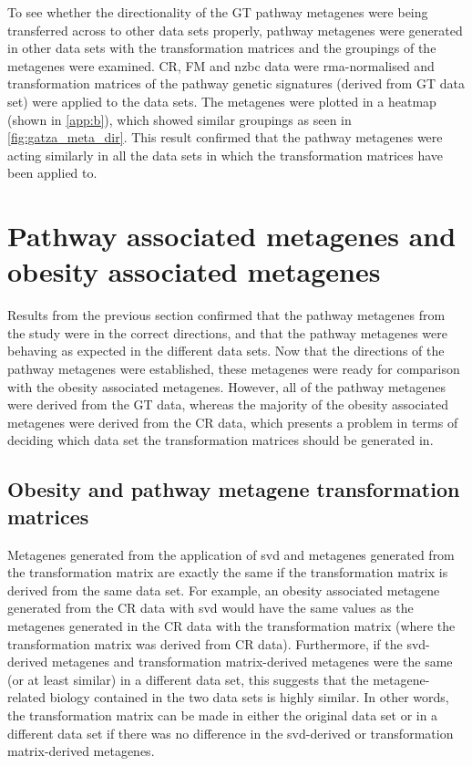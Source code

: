 To see whether the directionality of the GT pathway metagenes were being transferred across to other data sets properly, pathway metagenes were generated in other data sets with the transformation matrices and the groupings of the metagenes were examined.
CR, FM and \gls{nzbc} data were \gls{rma}-normalised and transformation matrices of the pathway genetic signatures (derived from GT data set) were applied to the data sets.
The metagenes were plotted in a heatmap (shown in \cref{app:b}), which showed similar groupings  as seen in \cref{fig:gatza_meta_dir}.
This result confirmed that the pathway metagenes were acting similarly in all the data sets in which the transformation matrices have been applied to.

\section{Pathway associated metagenes and obesity associated metagenes}
\label{sec:pathway_associated_metagenes_and_obesity_associated_metagenes}

Results from the previous section confirmed that the pathway metagenes from the \citet{Gatza2010a} study were in the correct directions, and that the pathway metagenes were behaving as expected in the different data sets.
Now that the directions of the pathway metagenes were established, these metagenes were ready for comparison with the obesity associated metagenes.
However, all of the pathway metagenes were derived from the GT data, whereas the majority of the obesity associated metagenes were derived from the CR data, which presents a problem in terms of deciding which data set the transformation matrices should be generated in.

\subsection{Obesity and pathway metagene transformation matrices}
\label{sub:obesity_and_pathway_metagene_transformation_matrices}

Metagenes generated from the application of \gls{svd} and metagenes generated from the transformation matrix are exactly the same if the transformation matrix is derived from the same data set.
For example, an obesity associated metagene generated from the CR data with \gls{svd} would have the same values as the metagenes generated in the CR data with the transformation matrix (where the transformation matrix was derived from CR data).
Furthermore, if the \gls{svd}-derived metagenes and transformation matrix-derived metagenes were the same (or at least similar) in a different data set, this suggests that the metagene-related biology contained in the two data sets is highly similar.
In other words, the transformation matrix can be made in either the original data set or in a different data set if there was no difference in the \gls{svd}-derived or transformation matrix-derived metagenes.

